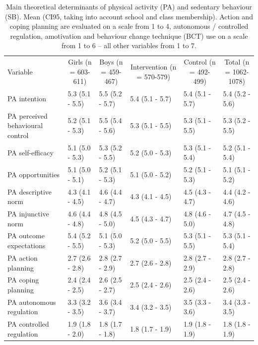 \documentclass[british,man]{apa6}
\makeatletter
\newenvironment{lltable}{\begin{landscape}\begin{center}\begin{ThreePartTable}}{\end{ThreePartTable}\end{center}\end{landscape}}
\newcommand\LastLTentrywidth{1em}
\newlength\longtablewidth
\newcommand{\getlongtablewidth}{\begingroup \ifcsname LT@\roman{LT@tables}\endcsname \global\longtablewidth=0pt \renewcommand{\LT@entry}[2]{\global\advance\longtablewidth by ##2\relax\gdef\LastLTentrywidth{##2}}\@nameuse{LT@\roman{LT@tables}} \fi \endgroup}
\makeatother
\begin{document}
\begin{lltable}


\begin{longtable}{llllll}\noalign{\getlongtablewidth\global\LTcapwidth=\longtablewidth}
\caption{\label{tab:determinant-table}Main theoretical determinants of physical activity (PA) and sedentary behaviour (SB). Mean (CI95, taking into account school and class membership). Action and coping planning are evaluated on a scale from 1 to 4, autonomous / controlled regulation, amotivation and behaviour change technique (BCT) use on a scale from 1 to 6 -- all other variables from 1 to 7.}\\
\toprule
Variable  & \multicolumn{1}{c}{Girls (n = 603-611)} & \multicolumn{1}{c}{Boys (n = 459-467)} & \multicolumn{1}{c}{Intervention (n = 570-579)} & \multicolumn{1}{c}{Control (n = 492-499)} & \multicolumn{1}{c}{Total (n = 1062-1078)}\\
\midrule
PA intention & 5.3 (5.1 - 5.5) & 5.5 (5.2 - 5.7) & 5.4 (5.1 - 5.7) & 5.4 (5.1 - 5.7) & 5.4 (5.2 - 5.6)\\
PA perceived behavioural control & 5.2 (5.1 - 5.3) & 5.5 (5.4 - 5.6) & 5.3 (5.1 - 5.5) & 5.3 (5.1 - 5.5) & 5.3 (5.2 - 5.5)\\
PA self-efficacy & 5.1 (5.0 - 5.3) & 5.3 (5.2 - 5.5) & 5.2 (5.0 - 5.3) & 5.3 (5.1 - 5.4) & 5.2 (5.1 - 5.4)\\
PA opportunities & 5.1 (5.0 - 5.1) & 5.2 (5.1 - 5.3) & 5.1 (5.0 - 5.2) & 5.2 (5.1 - 5.3) & 5.1 (5.1 - 5.2)\\
PA descriptive norm & 4.3 (4.1 - 4.5) & 4.6 (4.4 - 4.7) & 4.3 (4.1 - 4.5) & 4.5 (4.3 - 4.7) & 4.4 (4.2 - 4.6)\\
PA injunctive norm & 4.6 (4.4 - 4.8) & 4.8 (4.5 - 5.0) & 4.5 (4.3 - 4.7) & 4.8 (4.6 - 5.0) & 4.7 (4.5 - 4.8)\\
PA outcome expectations & 5.4 (5.2 - 5.5) & 5.1 (5.0 - 5.3) & 5.2 (5.0 - 5.5) & 5.3 (5.1 - 5.5) & 5.3 (5.1 - 5.4)\\
PA action planning & 2.7 (2.6 - 2.8) & 2.8 (2.7 - 2.9) & 2.7 (2.6 - 2.8) & 2.8 (2.7 - 2.9) & 2.8 (2.7 - 2.8)\\
PA coping planning & 2.4 (2.4 - 2.5) & 2.6 (2.5 - 2.7) & 2.5 (2.4 - 2.6) & 2.5 (2.4 - 2.6) & 2.5 (2.4 - 2.6)\\
PA autonomous regulation & 3.3 (3.2 - 3.5) & 3.6 (3.4 - 3.7) & 3.4 (3.2 - 3.5) & 3.5 (3.3 - 3.6) & 3.4 (3.3 - 3.5)\\
PA controlled regulation & 1.9 (1.8 - 2.0) & 1.8 (1.7 - 1.8) & 1.8 (1.7 - 1.9) & 1.9 (1.8 - 1.9) & 1.8 (1.8 - 1.9)\\

\end{longtable}
\end{lltable}
\end{document}
